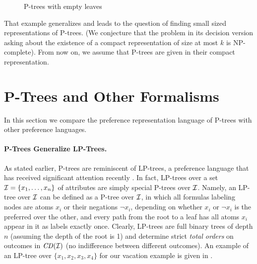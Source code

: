 \begin{figure}[!ht]
\begin{subfigure}[b]{0.2\textwidth}
	\end{subfigure}
  \caption{P-trees with empty leaves}
  \label{fig:PTree_EL}
\end{figure}

That example generalizes and leads to the question
of finding small sized representations of P-trees.
(We conjecture that the
problem in its decision version asking about the existence of a compact 
representation of size at most $k$ is NP-complete). 
From now on, we assume that P-trees are given in their compact representation. 


\section{P-Trees and Other Formalisms}

In this section we compare the preference representation language of P-trees
with other preference languages.


\paragraph{\bf P-Trees Generalize LP-Trees.}

As stated earlier, P-trees are reminiscent of LP-trees, a preference 
language that has received significant attention recently 
\cite{booth:learningLP,lang:aggLP,LiuT}. In fact, LP-trees over a set
$\mathcal{I}=\{x_1,\ldots,x_n\}$ of attributes are simply special P-trees over $\mathcal{I}$.
Namely, an LP-tree over $\mathcal{I}$ can be defined as a P-tree over $\mathcal{I}$, in
which all formulas labeling nodes are atoms $x_i$ or their negations $\neg x_i$,
depending on whether $x_i$ or $\neg x_i$ is the preferred over the other, and every path from 
the root to a leaf has all atoms $x_i$ appear in it as labels exactly 
once. Clearly, LP-trees are full binary trees of depth $n$ (assuming the depth of the root is 1) 
and determine strict \emph{total orders} on outcomes 
in $\mathit{CD}(\mathcal{I})$ (no indifference between different outcomes). An example 
of an LP-tree over $\{x_1,x_2,x_3,x_4\}$ for our vacation example is 
given in . 

